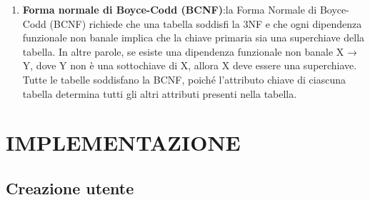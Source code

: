 \documentclass{article}
\begin{document}
\begin{flushleft}
\begin{enumerate}
            \item \textbf{Forma normale di Boyce-Codd (BCNF)}:la Forma Normale di Boyce-Codd (BCNF) richiede che una tabella soddisfi la 3NF e che ogni dipendenza funzionale non banale implica che la chiave primaria sia una superchiave della tabella. In altre parole, se esiste una dipendenza funzionale non banale X → Y, dove Y non è una sottochiave di X, allora X deve essere una superchiave. Tutte le tabelle soddisfano la BCNF, poiché l'attributo chiave di ciascuna tabella determina tutti gli altri attributi presenti nella tabella. \\
        \end{enumerate}
    \end{flushleft}
    
\newpage
\section{IMPLEMENTAZIONE}

\subsection{Creazione utente}
\end{document}
